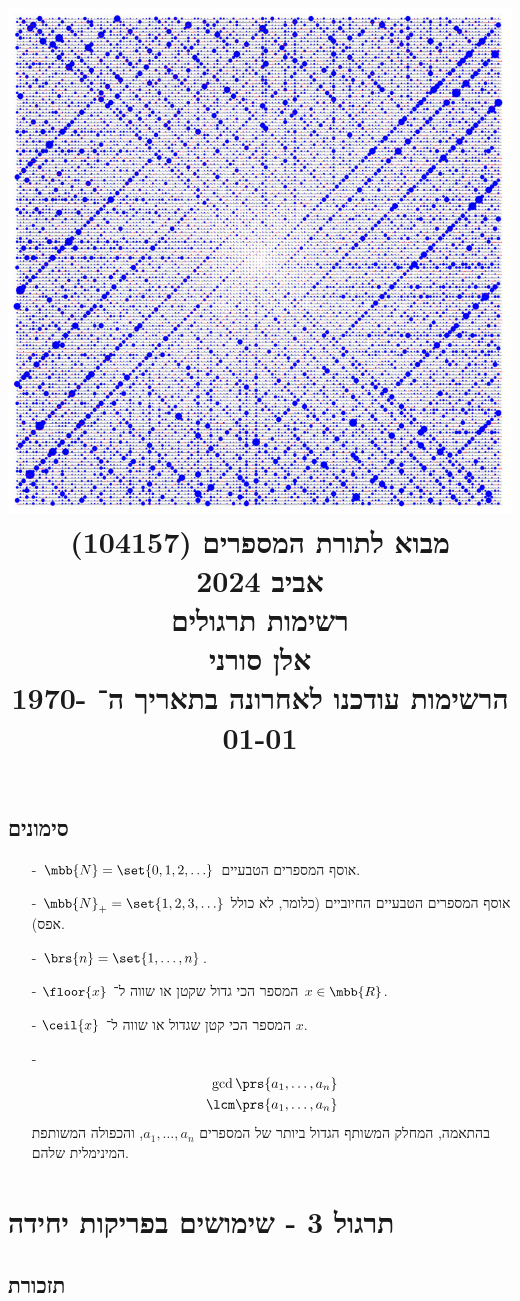 \documentclass[a4paper,10pt,twoside,openany]{book}
\title{
\includegraphics[width=6in]{images/front.png}\\
\vspace{30pt}
\Huge
מבוא לתורת המספרים (104157)
\\
אביב 2024
\\
רשימות תרגולים
\vspace{30pt}
\\
\huge
אלן סורני
\vspace{30pt}
\\
\Large
הרשימות עודכנו לאחרונה בתאריך ה־%
\today
}
\date{}
\begin{document}
\frontmatter
\maketitle
\tableofcontents

\mainmatter

\section*{סימונים}

\begin{itemize}
\item[-]
$\mbb{N} = \set{0, 1, 2, \ldots}$
אוסף המספרים הטבעיים.
\item[-]
$\mbb{N}_+ = \set{1, 2, 3, \ldots}$
אוסף המספרים הטבעיים החיוביים (כלומר, לא כולל אפס).
\item[-]
$\brs{n} = \set{1, \ldots, n}$.
\item[-]
$\floor{x}$
המספר הכי גדול שקטן או שווה ל־%
$x \in \mbb{R}$.
\item[-]
$\ceil{x}$
המספר הכי קטן שגדול או שווה ל־%
$x$.
\item[-]
\begin{align*}
\gcd\prs{a_1, \ldots, a_n} \\
\lcm\prs{a_1, \ldots, a_n}
\end{align*}
בהתאמה, המחלק המשותף הגדול ביותר של המספרים
$a_1, \ldots, a_n$,
והכפולה המשותפת המינימלית שלהם.
\end{itemize}

\chapter{תרגול 3 - שימושים בפריקות יחידה}

\section{תזכורת}
\end{document}
